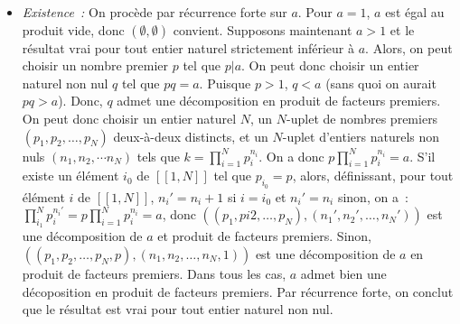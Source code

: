 \begin{itemize}
    \item \textit{Existence :} On procède par récurrence forte sur $a$. 
        Pour $a=1$, $a$ est égal au produit vide, donc $(\emptyset, \emptyset)$ convient. 
        Supposons maintenant $a > 1$ et le résultat vrai pour tout entier naturel strictement inférieur à $a$. 
        Alors, on peut choisir un nombre premier $p$ tel que $p \vert a$.
        On peut donc choisir un entier naturel non nul $q$ tel que $p q = a$. 
        Puisque $p > 1$, $q < a$ (sans quoi on aurait $p q > a$).
        Donc, $q$ admet une décomposition en produit de facteurs premiers. 
        On peut donc choisir un entier naturel $N$, un $N$-uplet de nombres premiers $\left( p_1, p_2, \dots, p_N \right)$ deux-à-deux distincts, et un $N$-uplet d'entiers naturels non nuls $\left( n_1, n_2, \cdots n_N \right)$ tels que $k = \prod_{i=1}^N p_i^{n_i}$.
        On a donc $p \prod_{i=1}^N p_i^{n_i} = a$. 
        S'il existe un élément $i_0$ de $[\![1,N]\!]$ tel que $p_{i_0} = p$, alors, définissant, pour tout élément $i$ de $[\![1,N]\!]$, $n_i' = n_i + 1$ si $i = i_0$ et $n_i' = n_i$ sinon, on a : $\prod_{i_1}^N p_i^{n_i'} = p \prod_{i=1}^N p_i^{n_i} = a$, donc $\left(\left( p_1, pi2, \dots, p_N \right), \left(n_1', n_2', \dots, n_N' \right) \right)$ est une décomposition de $a$ et produit de facteurs premiers. 
        Sinon, $\left( \left( p_1, p_2, \dots, p_N, p \right), \left( n_1, n_2, \dots, n_N, 1 \right) \right)$ est une décomposition de $a$ en produit de facteurs premiers.
        Dans tous les cas, $a$ admet bien une décoposition en produit de facteurs premiers.
        Par récurrence forte, on conclut que le résultat est vrai pour tout entier naturel non nul.


\end{itemize}
